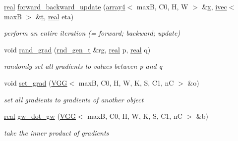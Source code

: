 \begin{DoxyCompactItemize}
\hyperlink{vgg__util_8h_a1082d08aaa761215ec83e7149f27ad16}{real} \hyperlink{structVGG_a5a97c3db3635e480b1160ff24793feb6}{forward\+\_\+backward\+\_\+update} (\hyperlink{structarray4}{array4}$<$ maxB, C0, H, W $>$ \&\hyperlink{structVGG_ab352e8c1793b749d92b85e75ca4f66e8}{x}, \hyperlink{structivec}{ivec}$<$ maxB $>$ \&\hyperlink{structVGG_a302cf15e5bd6f920d527334df6f3e2b2}{t}, \hyperlink{vgg__util_8h_a1082d08aaa761215ec83e7149f27ad16}{real} eta)
\begin{DoxyCompactList}\small\item\em perform an entire iteration (= forward; backward; update) \end{DoxyCompactList}\item 
void \hyperlink{structVGG_a4dfe4a13d0b10b743acb1f2c7ed9cea9}{rand\+\_\+grad} (\hyperlink{structrnd__gen__t}{rnd\+\_\+gen\+\_\+t} \&rg, \hyperlink{vgg__util_8h_a1082d08aaa761215ec83e7149f27ad16}{real} p, \hyperlink{vgg__util_8h_a1082d08aaa761215ec83e7149f27ad16}{real} q)
\begin{DoxyCompactList}\small\item\em randomly set all gradients to values between p and q \end{DoxyCompactList}\item 
void \hyperlink{structVGG_a278f6bb4011563977a3965d592eb7ce8}{set\+\_\+grad} (\hyperlink{structVGG}{V\+GG}$<$ maxB, C0, H, W, K, S, C1, nC $>$ \&o)
\begin{DoxyCompactList}\small\item\em set all gradients to gradients of another object \end{DoxyCompactList}\item 
\hyperlink{vgg__util_8h_a1082d08aaa761215ec83e7149f27ad16}{real} \hyperlink{structVGG_a07fae8209634342bbc335be1b342b8c7}{gw\+\_\+dot\+\_\+gw} (\hyperlink{structVGG}{V\+GG}$<$ maxB, C0, H, W, K, S, C1, nC $>$ \&b)
\begin{DoxyCompactList}\small\item\em take the inner product of gradients \end{DoxyCompactList}\end{DoxyCompactItemize}
